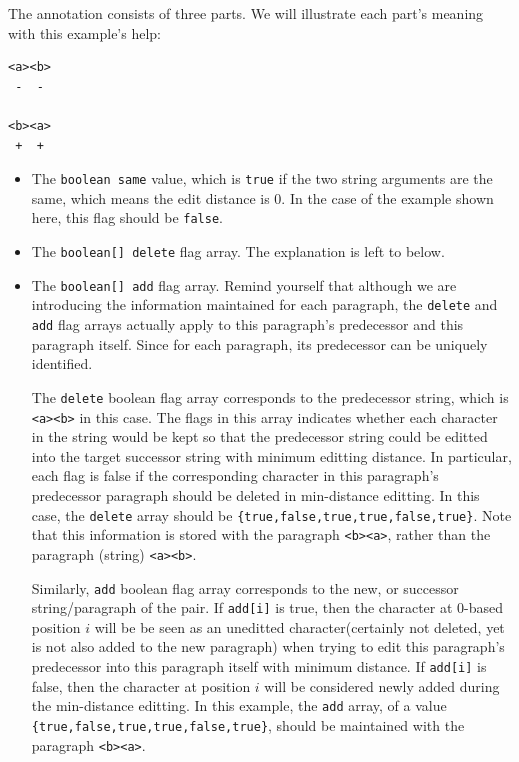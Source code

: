 \documentclass{article}
\begin{document}
\begin{enumerate}
\begin{itemize}
    The annotation consists of three parts. We will illustrate each part's meaning with this example's help:
    \begin{lstlisting}
<a><b>
 -  -

<b><a>
 +  +
    \end{lstlisting}
    \begin{itemize}
      \item The \texttt{boolean same} value, which is \texttt{true} if the two string arguments are the same, which means the edit distance is 0. In the case of the example shown here, this flag should be \texttt{false}.
      \item The \texttt{boolean[] delete} flag array. The explanation is left to below.
      \item The \texttt{boolean[] add} flag array. Remind yourself that although we are introducing the information maintained for each paragraph, the \texttt{delete} and \texttt{add} flag arrays actually apply to this paragraph's predecessor and this paragraph itself. Since for each paragraph, its predecessor can be uniquely identified.

      The \texttt{delete} boolean flag array corresponds to the predecessor string, which is \texttt{<a><b>} in this case. The flags in this array indicates whether each character in the string would be kept so that the predecessor string could be editted into the target successor string with minimum editting distance. In particular, each flag is false if the corresponding character in this paragraph's predecessor paragraph should be deleted in min-distance editting. In this case, the \texttt{delete} array should be \texttt{\{true,false,true,true,false,true\}}. Note that this information is stored with the paragraph \texttt{<b><a>}, rather than the paragraph (string) \texttt{<a><b>}.

      Similarly, \texttt{add} boolean flag array corresponds to the new, or successor string/paragraph of the pair. If \texttt{add[i]} is true, then the character at 0-based position $i$ will be be seen as an uneditted character(certainly not deleted, yet is not also added to the new paragraph) when trying to edit this paragraph's predecessor into this paragraph itself with minimum distance. If \texttt{add[i]} is false, then the character at position $i$ will be considered newly added during the min-distance editting. In this example, the \texttt{add} array, of a value \texttt{\{true,false,true,true,false,true\}}, should be maintained with the paragraph \texttt{<b><a>}.
    \end{itemize}
  \end{itemize}
\end{enumerate}
\end{document}

